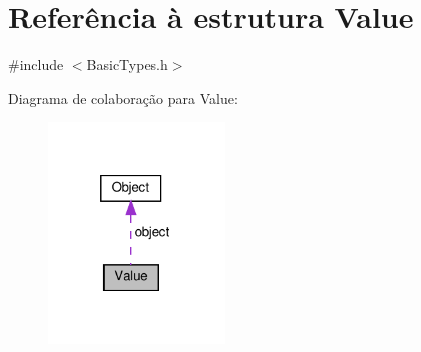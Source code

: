 \hypertarget{structValue}{}\section{Referência à estrutura Value}
\label{structValue}


{\ttfamily \#include $<$Basic\+Types.\+h$>$}



Diagrama de colaboração para Value\+:\nopagebreak
\begin{figure}[H]
\begin{center}
\leavevmode
\includegraphics[width=133pt]{structValue__coll__graph}
\end{center}
\end{figure}
